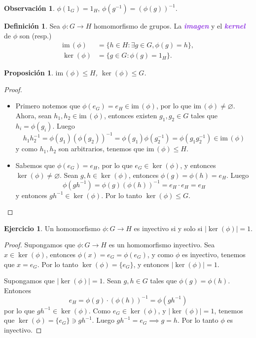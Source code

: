 \documentclass{article}
\newtheorem{proposition}[theorem]{Proposición}
\theoremstyle{definition}
\newtheorem{definition}[theorem]{Definición}
\newtheorem{exercise}{Ejercicio}
\newtheorem*{obs}{Observación}
\theoremstyle{remark}
\numberwithin{equation}{section}
\renewcommand{\c}{\cdot}
\newcommand{\im}{\mathrm{im}\,}
\newcommand{\abs}[1]{\left| #1 \right|}
\newcommand{\wea}[1]{\textcolor{BlueViolet}{\textbf{\emph{#1}}}}
\begin{document}
\begin{obs}
  $\phi(1_G) = 1_H$, $\phi(g^{-1}) = (\phi(g))^{-1}$.
\end{obs}

\begin{definition}
  Sea $\phi \colon G \to H$ homomorfismo de grupos. La \wea{imagen} y el \wea{kernel} de $\phi$ son (resp.)
  \begin{align*}
    \im(\phi) &= \{h \in H \colon \exists g \in G, \phi(g) = h\}, \\
    \ker(\phi) &= \{g \in G \colon \phi(g) = 1_H\}.
  \end{align*}
\end{definition}

\begin{proposition}
  $\im(\phi) \leqslant H$, $\ker(\phi) \leqslant G$.
\end{proposition}
\begin{proof}
  \
  \begin{itemize}
    \item \boxed{\im\phi} Primero notemos que $\phi(e_G) = e_H \in \im(\phi)$, por lo que $\im(\phi) \neq \varnothing$. Ahora, sean $h_1,h_2 \in \im(\phi)$, entonces existen $g_1,g_2 \in G$ tales que $h_i = \phi(g_i)$. Luego $$h_1 h_2^{-1} = \phi(g_1) (\phi(g_2))^{-1} = \phi(g_1) \phi(g_2^{-1}) = \phi(g_1 g_2^{-1}) \in \im(\phi)$$ y como $h_1,h_2$ son arbitrarios, tenemos que $\im(\phi) \leqslant H$.
    \item \boxed{\ker(\phi)} Sabemos que $\phi(e_G) = e_H$, por lo que $e_G \in \ker(\phi)$, y entonces $\ker(\phi) \neq \varnothing$. Sean $g,h \in \ker(\phi)$, entonces $\phi(g) = \phi(h) = e_H$. Luego $$\phi(gh^{-1}) = \phi(g) (\phi(h))^{-1} = e_H \c e_H = e_H$$ y entonces $gh^{-1} \in \ker(\phi)$. Por lo tanto $\ker(\phi) \leqslant G$.
  \end{itemize}
\end{proof}

\begin{exercise}
  Un homomorfismo $\phi \colon G \to H$ es inyectivo si y solo si $\abs{\ker(\phi)} = 1$.
\end{exercise}
\begin{proof}
  \boxed{\implies}
  Supongamos que $\phi \colon G \to H$ es un homomorfismo inyectivo. Sea $x \in \ker(\phi)$, entonces $\phi(x) = e_G = \phi(e_G)$, y como $\phi$ es inyectivo, tenemos que $x = e_G$. Por lo tanto $\ker(\phi) = \{e_G\}$, y entonces $\abs{\ker(\phi)} = 1$.

  \boxed{\impliedby}
  Supongamos que $\abs{\ker(\phi)} = 1$. Sean $g,h \in G$ tales que $\phi(g) = \phi(h)$. Entonces
  $$e_H = \phi(g) \c (\phi(h))^{-1} = \phi(gh^{-1})$$
  por lo que $gh^{-1} \in \ker(\phi)$. Como $e_G \in \ker(\phi)$, y $|\ker(\phi)| = 1$, tenemos que $\ker(\phi) = \{e_G\} \ni gh^{-1}$. Luego $gh^{-1} = e_G \implies g=h$. Por lo tanto $\phi$ es inyectivo.
\end{proof}
\end{document}
